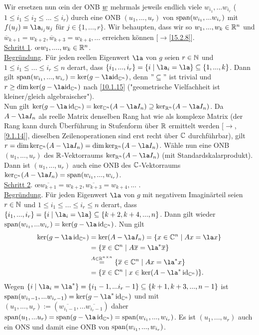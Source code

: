 \documentclass[../../main.tex]{subfiles}
\begin{document}
\begin{cproof}
\noindent Wir ersetzen nun \oe in der ONB ${\underline w}$ mehrmals jeweils endlich viele $w_{i_1},...w_{i_r}$ ($1\le i_1\le i_2\le...\le i_r$) durch eine ONB $(u_1,...,u_r)$ von $\operatorname{span}(w_{i_1},...w_{i_r})$ mit $f(u_j)=\la_{i_j}u_j$ für $j\in\{1,...,r\}$. Wir behaupten, dass wir so $w_1,...,w_k\in \mathbb R^n$ und $\overline{w}_{k+1}=w_{k+2},\overline{w}_{k+3}=w_{k+4},...$ erreichen können [$\to$\ref{15.2.8}].\\
		
\noindent\underline{Schritt 1}. \oe $w_1,....,w_k\in \mathbb R^n$.\\
\underline{Begründung}. Für jeden reellen Eigenwert $\la$ von $g$ seien $r\in \mathbb N$ und $1\le i_1\le...\le i_r\le n$ derart, dass $\{i_1,...,i_r\}=\{i\mid \la_i=\la\}\subseteq\{1,...,k\}$. Dann gilt $\lin(w_{i_1},...,w_{i_r})=\ker(g-\la\text{id}_{\C^n})$, denn $"\subseteq"$ ist trivial und $r\ge \dim\ker(g-\la\text{id}_{\C^n})$ nach \ref{10.1.15} ("geometrische Vielfachheit ist kleiner/gleich algebraischer").\\
Nun gilt $\ker(g-\la\id_{\C^n})=\ker_{\C^n}(A-\la I_n)\supseteq \ker_{\R^n}(A-\la I_n)$. Da $A-\la I_n$ als reelle Matrix denselben Rang hat wie als komplexe Matrix (der Rang kann durch Überführung in Stufenform über $\mathbb R$ ermittelt werden [$\to$,\ref{9.1.14}], dieselben Zeilenoperationen sind erst recht über $\mathbb C$ durchführbar), gilt $r=\dim\ker_{\C^n}(A-\la I_n)=\dim\ker_{\R^n}(A-\la I_n)$. Wähle nun eine ONB $(u_1,...,u_r)$ des $\mathbb R$-Vektorraums $\ker_{\R^n}(A-\la I_n)$ (mit Standardskalarprodukt). Dann ist $(u_1,...,u_r)$ auch eine ONB des $\mathbb C$-Vektorraums $\ker_{\C^n}(A-\la I_n)=\lin(w_{i_1},...,w_{i_r})$.\\
		
\noindent\underline{Schritt 2}. \oe $\overline{w_{k+1}}=w_{k+2},\overline{w_{k+3}}=w_{k+4},...$ .\\
\noindent\underline{Begründung}. Für jeden Eigenwert $\la$ von $g$ mit negativem Imaginärteil seien $r\in \mathbb N$ und $1\le i_1\le...\le i_r\le n$ derart, dass $\{i_1,...,i_r\}=\{i\mid \la_i=\la\}\subseteq\{k+2,k+4,...,n\}$. Dann gilt wieder $\lin(w_{i_1},...w_{i_r})=\ker(g-\la \id_{\C^n})$. Nun gilt
\begin{align*}
\ker(g-\la \id_{\C^n})&=\ker(A-\la I_n)=\{x\in \C^n\mid Ax=\la x\}\\
&=\{\overline{x}\in \C^n\mid A\overline{x}=\la^* \overline{x}\}\\
&\stackrel{A\in \R^{n\times n}}{=}\{\overline{x}\in \C^n\mid Ax=\la^* x\}\\
&=\{\overline{x}\in \C^n\mid x\in \ker(A-\la^* \id_{\C^n })\}.
\end{align*}
Wegen $\{i\mid \la_i=\la^*\}=\{i_1-1,...i_r-1\}\subseteq\{k+1,k+3,...,n-1\}$ ist $\lin(w_{i_1-1},...w_{i_r-1})=\ker(g-\la^*\id_{\C^n})$ und mit $(u_1,...,u_r):=(\overline{w_{i_1-1}},...\overline{w_{i_r-1}})$ daher $\lin(u_1,...u_r)=\lin(g-\la \id_{\C^n})=\lin(w_{i_1},...,w_{i_r})$. Es ist $(u_1,...,u_r)$ auch ein ONS und damit eine ONB von $\operatorname{span}(w_{i_1},...,w_{i_r})$.\\
		

\end{cproof}
\end{document}
